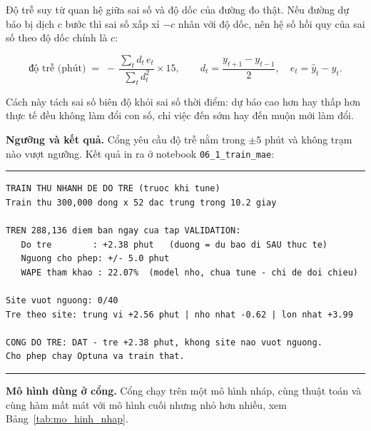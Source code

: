 Độ trễ suy từ quan hệ giữa sai số và độ dốc của đường đo thật. Nếu đường dự báo bị dịch
$c$ bước thì sai số xấp xỉ $-c$ nhân với độ dốc, nên hệ số hồi quy của sai số theo độ dốc
chính là $c$:

\begin{equation}
\text{độ trễ (phút)} \;=\; -\,\frac{\sum_t d_t \, e_t}{\sum_t d_t^{2}} \times 15,
\qquad
d_t = \frac{y_{t+1} - y_{t-1}}{2}, \quad e_t = \hat{y}_t - y_t .
\end{equation}

Cách này tách sai số biên độ khỏi sai số thời điểm: dự báo cao hơn hay thấp hơn thực tế
đều không làm đổi con số, chỉ việc đến sớm hay đến muộn mới làm đổi.

\textbf{Ngưỡng và kết quả.} Cổng yêu cầu độ trễ nằm trong $\pm 5$ phút và không trạm nào vượt
ngưỡng. Kết quả in ra ở notebook \texttt{06\_1\_train\_mae}:

\begingroup
\par\vspace{6pt}\hrule\vspace{4pt}
\small\renewcommand{\baselinestretch}{1.0}\selectfont
\begin{verbatim}
TRAIN THU NHANH DE DO TRE (truoc khi tune)
Train thu 300,000 dong x 52 dac trung trong 10.2 giay

TREN 288,136 diem ban ngay cua tap VALIDATION:
   Do tre        : +2.38 phut   (duong = du bao di SAU thuc te)
   Nguong cho phep: +/- 5.0 phut
   WAPE tham khao : 22.07%  (model nho, chua tune - chi de doi chieu)

Site vuot nguong: 0/40
Tre theo site: trung vi +2.56 phut | nho nhat -0.62 | lon nhat +3.99

CONG DO TRE: DAT - tre +2.38 phut, khong site nao vuot nguong.
Cho phep chay Optuna va train that.
\end{verbatim}
\vspace{2pt}\hrule\par\vspace{6pt}
\endgroup

\textbf{Mô hình dùng ở cổng.} Cổng chạy trên một mô hình nháp, cùng thuật toán và cùng hàm
mất mát với mô hình cuối nhưng nhỏ hơn nhiều, xem Bảng~\ref{tab:mo_hinh_nhap}.

